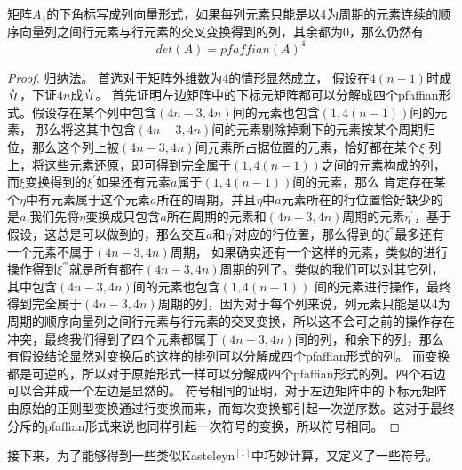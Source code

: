 \documentclass[twoside,a4paper,CCT]{cctart}   %
\begin{document}
\begin{theorem}
矩阵$A_{4}$的下角标写成列向量形式，如果每列元素只能是以4为周期的元素连续的顺序向量列之间行元素与行元素的交叉变换得到的列，其余都为0，那么仍然有$$det(A)=pfaffian(A)^{4}$$
\end{theorem}
\begin{proof}
归纳法。
首选对于矩阵外维数为4的情形显然成立，
假设在$4(n-1)$时成立，下证$4n$成立。
首先证明左边矩阵中的下标元矩阵都可以分解成四个pfaffian形式。假设存在某个列中包含$(4n-3,4n)$间的元素也包含$(1,4(n-1))$间的元素，
那么将这其中包含$(4n-3,4n)$间的元素剔除掉剩下的元素按某个周期归位，那么这个列上被$(4n-3,4n)$间元素所占据位置的元素，恰好都在某个$\xi$
列上，将这些元素还原，即可得到完全属于$(1,4(n-1))$之间的元素构成的列，而$\xi$变换得到的$\xi^{'}$如果还有元素$a$属于$(1,4(n-1))$间的元素，那么
肯定存在某个$\eta$中有元素属于这个元素$a$所在的周期，并且$\eta$中$a$元素所在的行位置恰好缺少的是$a$,我们先将$\eta$变换成只包含$a$所在周期的元素和$(4n-3,4n)$周期的元素$\eta^{'}$，基于假设，这总是可以做到的，那么交互$a$和$\eta^{'}$对应的行位置，那么得到的$\xi^{''}$最多还有一个元素不属于$(4n-3,4n)$周期，
如果确实还有一个这样的元素，类似的进行操作得到$\xi^{'''}$就是所有都在$(4n-3,4n)$周期的列了。类似的我们可以对其它列，其中包含$(4n-3,4n)$间的元素也包含$(1,4(n-1))$ 间的元素进行操作，最终得到完全属于$(4n-3,4n)$周期的列，因为对于每个列来说，列元素只能是以4为周期的顺序向量列之间行元素与行元素的交叉变换，所以这不会可之前的操作存在冲突，最终我们得到了四个元素都属于$(4n-3,4n)$间的列，和余下的列，那么有假设结论显然对变换后的这样的排列可以分解成四个pfaffian形式的列。
而变换都是可逆的，所以对于原始形式一样可以分解成四个pfaffian形式的列。四个右边可以合并成一个左边是显然的。
符号相同的证明，对于左边矩阵中的下标元矩阵由原始的正则型变换通过行变换而来，而每次变换都引起一次逆序数。这对于最终分斥的pfaffian形式来说也同样引起一次符号的变换，所以符号相同。
\end{proof}
接下来，为了能够得到一些类似Kasteleyn$^{[1]}$中巧妙计算，又定义了一些符号。
\end{document}
